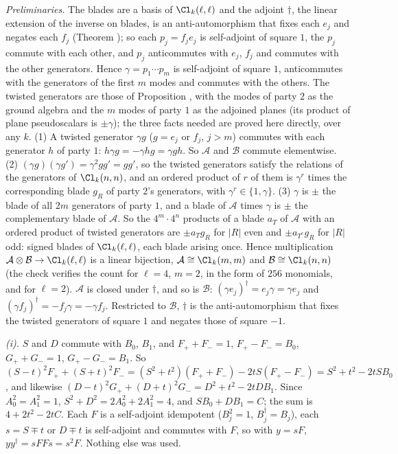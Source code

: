 \emph{Preliminaries.} The blades are a basis of $\Cl_{k}(\ell,\ell)$ and the adjoint $\dagger$, the linear extension of the inverse on blades, is an anti-automorphism that fixes each $e_{j}$ and negates each $f_{j}$ (Theorem ); so each $p_{j} = f_{j}e_{j}$ is self-adjoint of square $1$, the $p_{j}$ commute with each other, and $p_{j}$ anticommutes with $e_{j}$, $f_{j}$ and commutes with the other generators. Hence $\gamma = p_{1}\cdots p_{m}$ is self-adjoint of square $1$, anticommutes with the generators of the first $m$ modes and commutes with the others. The twisted generators are those of Proposition , with the modes of party $2$ as the ground algebra and the $m$ modes of party $1$ as the adjoined planes (its product of plane pseudoscalars is $\pm\gamma$); the three facts needed are proved here directly, over any $k$. (1) A twisted generator $\gamma g$ ($g = e_{j}$ or $f_{j}$, $j > m$) commutes with each generator $h$ of party $1$: $h\gamma g = -\gamma hg = \gamma gh$. So $\mathcal{A}$ and $\mathcal{B}$ commute elementwise. (2) $(\gamma g)(\gamma g') = \gamma^{2}gg' = gg'$, so the twisted generators satisfy the relations of the generators of $\Cl_{k}(n,n)$, and an ordered product of $r$ of them is $\gamma^{r}$ times the corresponding blade $g_{R}$ of party $2$'s generators, with $\gamma^{r} \in \{1, \gamma\}$. (3) $\gamma$ is $\pm$ the blade of all $2m$ generators of party $1$, and a blade of $\mathcal{A}$ times $\gamma$ is $\pm$ the complementary blade of $\mathcal{A}$. So the $4^{m}\cdot 4^{n}$ products of a blade $a_{T}$ of $\mathcal{A}$ with an ordered product of twisted generators are $\pm a_{T}g_{R}$ for $|R|$ even and $\pm a_{T^{c}}g_{R}$ for $|R|$ odd: signed blades of $\Cl_{k}(\ell,\ell)$, each blade arising once. Hence multiplication $\mathcal{A} \otimes \mathcal{B} \to \Cl_{k}(\ell,\ell)$ is a linear bijection, $\mathcal{A} \cong \Cl_{k}(m,m)$ and $\mathcal{B} \cong \Cl_{k}(n,n)$ (the check verifies the count for $\ell = 4$, $m = 2$, in the form of $256$ monomials, and for $\ell = 2$). $\mathcal{A}$ is closed under $\dagger$, and so is $\mathcal{B}$: $(\gamma e_{j})^{\dagger} = e_{j}\gamma = \gamma e_{j}$ and $(\gamma f_{j})^{\dagger} = -f_{j}\gamma = -\gamma f_{j}$. Restricted to $\mathcal{B}$, $\dagger$ is the anti-automorphism that fixes the twisted generators of square $1$ and negates those of square $-1$.

\emph{(i).} $S$ and $D$ commute with $B_{0}$, $B_{1}$, and $F_{+} + F_{-} = 1$, $F_{+} - F_{-} = B_{0}$, $G_{+} + G_{-} = 1$, $G_{+} - G_{-} = B_{1}$. So $(S - t)^{2}F_{+} + (S + t)^{2}F_{-} = (S^{2} + t^{2})(F_{+} + F_{-}) - 2tS(F_{+} - F_{-}) = S^{2} + t^{2} - 2tSB_{0}$, and likewise $(D - t)^{2}G_{+} + (D + t)^{2}G_{-} = D^{2} + t^{2} - 2tDB_{1}$. Since $A_{0}^{2} = A_{1}^{2} = 1$, $S^{2} + D^{2} = 2A_{0}^{2} + 2A_{1}^{2} = 4$, and $SB_{0} + DB_{1} = C$; the sum is $4 + 2t^{2} - 2tC$. Each $F$ is a self-adjoint idempotent ($B_{j}^{2} = 1$, $B_{j}^{\dagger} = B_{j}$), each $s = S \mp t$ or $D \mp t$ is self-adjoint and commutes with $F$, so with $y = sF$, $yy^{\dagger} = sFFs = s^{2}F$. Nothing else was used.


